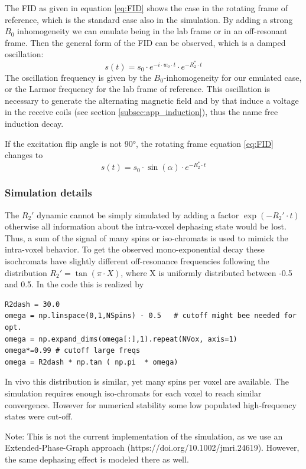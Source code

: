 \documentclass[a4paper,12pt]{extarticle}
\begin{document}
The FID as given in equation \eqref{eq:FID} shows the case in the rotating frame of reference, which is the standard case also in the simulation. By adding a strong $B_0$ inhomogeneity we can emulate being in the lab frame or in an off-resonant frame. Then the general form of the FID can be observed, which is a damped oscillation:
\begin{equation}
\label{eq:FIDlab}
s(t)=s_0\cdot e^{-i\cdot w_0\cdot t}\cdot e^{-R_2^*\cdot t}
\end{equation}The oscillation frequency is given by the $B_0$-inhomogeneity for our emulated case, or the Larmor frequency for the lab frame of reference. This oscillation is necessary to generate the alternating magnetic field and by that induce a voltage in the receive coils (see section \ref{subsec:app_induction}), thus the name free induction decay.

If the excitation flip angle is not 90°, the rotating frame equation \eqref{eq:FID} changes to
\begin{equation}
\label{eq:FIDalpha}
s(t)=s_0\cdot \sin(\alpha)\cdot e^{-R_2^*\cdot t}
\end{equation}
\subsubsection{Simulation details}
The $R_2'$ dynamic cannot be simply simulated by adding a factor $\exp{(-R_2'\cdot t)}$ otherwise all information about the intra-voxel dephasing state would be lost. Thus, a sum of the signal of many spins or iso-chromats is used to mimick the intra-voxel behavior.
To get the observed mono-exponential decay these isochromats have slightly different off-resonance frequencies following the distribution $R_2'=\tan{(\pi\cdot X)}$, where X is uniformly distributed between -0.5 and 0.5. In the code this is realized by 
\begin{verbatim}
R2dash = 30.0
omega = np.linspace(0,1,NSpins) - 0.5   # cutoff might bee needed for opt.
omega = np.expand_dims(omega[:],1).repeat(NVox, axis=1)
omega*=0.99 # cutoff large freqs
omega = R2dash * np.tan ( np.pi  * omega)
\end{verbatim}
In vivo this distribution is similar, yet many spins per voxel are available. The simulation requires enough iso-chromats for each voxel to reach similar convergence. However for numerical stability some low populated high-frequency states were cut-off.

Note: This is not the current implementation of the simulation, as we use an Extended-Phase-Graph approach (https://doi.org/10.1002/jmri.24619). However, the same dephasing effect is modeled there as well.
\end{document}
